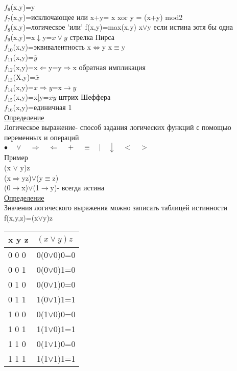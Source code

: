 \documentclass{article}
\begin{document}
$f_6$(x,y)=y\\
$f_7$(x,y)=исключающее или x+y= x xor y = (x+y) mod2\\
$f_8$(x,y)=логическое 'или' f(x,y)=max(x,y) x$\vee$y если истина зотя бы одна\\
$f_9$(x,y)=x$\downarrow$y=$\overline{x\vee y}$ стрелка Пирса\\
$f_{10}$(x,y)=эквивалентность x$\Leftrightarrow$y x$\equiv$y\\
$f_{11}$(x,y)=$\overline{y}$\\
$f_{12}$(x,y)=x$\Leftarrow$y=y$\Rightarrow$x обратная импликация\\
$f_{13}$(X,y)=$\overline{x}$\\
$f_{14}$(x,y)=$x\Rightarrow y$=x$\rightarrow y$\\
$f_{15}$(x,y)=x|y=$\overline{xy}$ штрих Шеффера\\
$f_{16}$(x,y)=единичная 1\\
\underline{Определение}\\
Логическое выражение- способ задания логических функций с помощью переменных и операций\\
$\bullet \quad \vee \quad \Rightarrow \quad \Leftarrow \quad + \quad \equiv \quad |\quad \downarrow\quad <\quad > $\\
Пример\\
(x $\vee$ y)z\\
(x$\Rightarrow$yz)$\vee$(y$\equiv$z)\\
(0$\rightarrow$x)$\vee$(1$\rightarrow$y)- всегда истина\\
\underline{Определение}\\
Значения логического выражения можно записать таблицей истинности\\
f(x,y,z)=(x$\vee$y)z\\
\begin{tabular}{l|l}
x y z&$(x\vee y)z$\\
\hline
0 0 0 &0\qquad (0$\vee$0)0=0\\
0 0 1 &0\qquad (0$\vee$0)1=0\\
0 1 0 &0\qquad (0$\vee$1)0=0\\
0 1 1 &1\qquad (0$\vee$1)1=1\\
1 0 0 &0\qquad (1$\vee$0)0=0\\
1 0 1 &1\qquad (1$\vee$0)1=1\\
1 1 0 &0\qquad (1$\vee$1)0=0\\
1 1 1 &1\qquad (1$\vee$1)1=1\\
\end{tabular}\\
\end{document}
